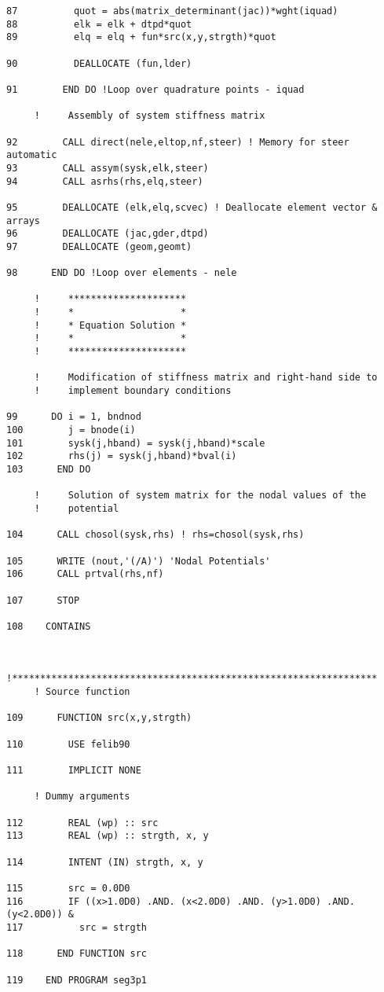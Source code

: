 \begin{verbatim}
87          quot = abs(matrix_determinant(jac))*wght(iquad)
88          elk = elk + dtpd*quot
89          elq = elq + fun*src(x,y,strgth)*quot
     
90          DEALLOCATE (fun,lder)
     
91        END DO !Loop over quadrature points - iquad
     
     !     Assembly of system stiffness matrix
     
92        CALL direct(nele,eltop,nf,steer) ! Memory for steer automatic
93        CALL assym(sysk,elk,steer)
94        CALL asrhs(rhs,elq,steer)
     
95        DEALLOCATE (elk,elq,scvec) ! Deallocate element vector & arrays
96        DEALLOCATE (jac,gder,dtpd)
97        DEALLOCATE (geom,geomt)
     
98      END DO !Loop over elements - nele
     
     !     *********************
     !     *                   *
     !     * Equation Solution *
     !     *                   *
     !     *********************
     
     !     Modification of stiffness matrix and right-hand side to
     !     implement boundary conditions
     
99      DO i = 1, bndnod
100        j = bnode(i)
101        sysk(j,hband) = sysk(j,hband)*scale
102        rhs(j) = sysk(j,hband)*bval(i)
103      END DO
     
     !     Solution of system matrix for the nodal values of the
     !     potential
     
104      CALL chosol(sysk,rhs) ! rhs=chosol(sysk,rhs)
     
105      WRITE (nout,'(/A)') 'Nodal Potentials'
106      CALL prtval(rhs,nf)
     
107      STOP
     
108    CONTAINS
     
     
     !*****************************************************************
     ! Source function
     
109      FUNCTION src(x,y,strgth)
     
110        USE felib90
     
111        IMPLICIT NONE
     
     ! Dummy arguments
     
112        REAL (wp) :: src
113        REAL (wp) :: strgth, x, y
     
114        INTENT (IN) strgth, x, y
     
115        src = 0.0D0
116        IF ((x>1.0D0) .AND. (x<2.0D0) .AND. (y>1.0D0) .AND. (y<2.0D0)) &
117          src = strgth
     
118      END FUNCTION src
     
119    END PROGRAM seg3p1
\end{verbatim}
